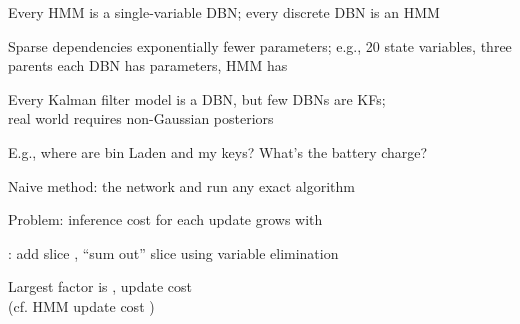 \documentclass{article}
\begin{document}
\begin{huge}
\vspace{0.2in}





Every HMM is a single-variable DBN; every discrete DBN is an HMM

\vspace*{0.2in}

\textwidth
{}

Sparse dependencies \mat{$\Rightarrow$} exponentially fewer parameters;\al
e.g., 20 state variables, three parents each\al
DBN has  parameters, HMM has 


Every Kalman filter model is a DBN, but few DBNs are KFs;\\
real world requires non-Gaussian posteriors

E.g., where are bin Laden and my keys? What's the battery charge?

\vspace{0.2in}






Naive method:  the network and run any exact algorithm

\vspace*{0.2in}

\textwidth
{}

Problem: inference cost for each update grows with 

: add slice , ``sum out'' slice  using variable elimination

Largest factor is , update cost \\
(cf. HMM update cost )




\end{huge}
\end{document}
